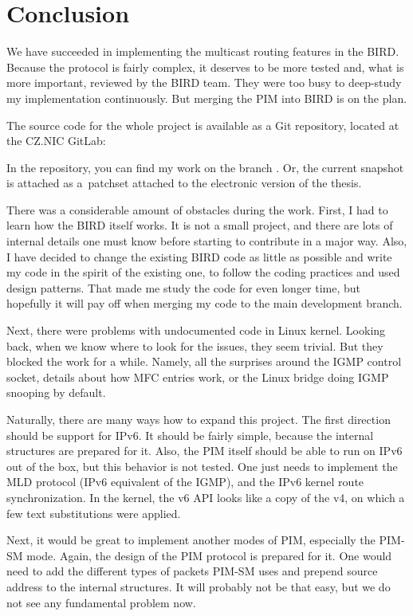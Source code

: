 \chapter*{Conclusion}

We have succeeded in implementing the multicast routing features in the BIRD.
Because the protocol is fairly complex, it deserves to be more tested and, what
is more important, reviewed by the BIRD team. They were too busy to deep-study
my implementation continuously. But merging the PIM into BIRD is on the plan.

The source code for the whole project is available as a Git repository,
located at the CZ.NIC GitLab:

\centerline{}

In the repository, you can find my work on the branch . Or, the
current snapshot is attached as a~patchset attached to the electronic version
of the thesis.

There was a considerable amount of obstacles during the work. First, I had to
learn how the BIRD itself works. It is not a small project, and there are lots
of internal details one must know before starting to contribute in a major way.
Also, I have decided to change the existing BIRD code as little as possible and
write my code in the spirit of the existing one, to follow the coding practices
and used design patterns. That made me study the code for even longer time, but
hopefully it will pay off when merging my code to the main development branch.

Next, there were problems with undocumented code in Linux kernel. Looking back,
when we know where to look for the issues, they seem trivial. But they blocked
the work for a while. Namely, all the surprises around the IGMP control socket,
details about how MFC entries work, or the Linux bridge doing IGMP snooping by
default.

Naturally, there are many ways how to expand this project. The first direction
should be support for IPv6. It should be fairly simple, because the internal
structures are prepared for it. Also, the PIM itself should be able to run on
IPv6 out of the box, but this behavior is not tested. One just needs to
implement the MLD protocol (IPv6 equivalent of the IGMP), and the IPv6 kernel
route synchronization. In the kernel, the v6 API looks like a copy of the v4,
on which a few text substitutions were applied.

Next, it would be great to implement another modes of PIM, especially the PIM-SM mode.
Again, the design of the PIM protocol is prepared for it. One would need to
add the different types of packets PIM-SM uses and prepend source address to
the internal structures. It will probably not be that easy, but we do not see
any fundamental problem now.

